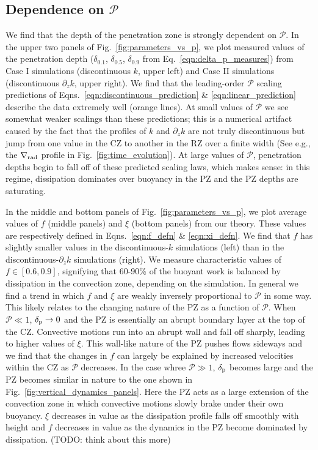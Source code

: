 \documentclass{aastex631}
\newcommand{\gradrad}{\ensuremath{\nabla_{\rm{rad}}}}
\newcommand{\delp}{\ensuremath{\delta_{\rm{p}}}}
\newcommand{\mP}{\ensuremath{\mathcal{P}}}
\begin{document}
\subsection{Dependence on $\mP$}

We find that the depth of the penetration zone is strongly dependent on $\mP$.
In the upper two panels of Fig.~\ref{fig:parameters_vs_p}, we plot measured values of the penetration depth ($\delta_{0.1}$, $\delta_{0.5}$, $\delta_{0.9}$ from Eq.~\ref{eqn:delta_p_measures}) from Case I simulations (discontinuous $k$, upper left) and Case II simulations (discontinuous $\partial_z k$, upper right).
We find that the leading-order $\mP$ scaling predictions of Eqns.~\ref{eqn:discontinuous_prediction} \& \ref{eqn:linear_prediction} describe the data extremely well (orange lines).
At small values of $\mP$ we see somewhat weaker scalings than these predictions; this is a numerical artifact caused by the fact that the profiles of $k$ and $\partial_z k$ are not truly discontinuous but jump from one value in the CZ to another in the RZ over a finite width (See e.g., the $\gradrad$ profile in Fig.~\ref{fig:time_evolution}).
At large values of $\mP$, penetration depths begin to fall off of these predicted scaling laws, which makes sense: in this regime, dissipation dominates over buoyancy in the PZ and the PZ depths are saturating.

In the middle and bottom panels of Fig.~\ref{fig:parameters_vs_p}, we plot average values of $f$ (middle panels) and $\xi$ (bottom panels) from our theory.
These values are respectively defined in Eqns.~\ref{eqn:f_defn} \& \ref{eqn:xi_defn}.
We find that $f$ has slightly smaller values in the discontinuous-$k$ simulations (left) than in the discontinuous-$\partial_z k$ simulations (right).
We measure characteristic values of $f \in [0.6, 0.9]$, signifying that 60-90\% of the buoyant work is balanced by dissipation in the convection zone, depending on the simulation.
In general we find a trend in which $f$ and $\xi$ are weakly inversely proportional to $\mP$ in some way.
This likely relates to the changing nature of the PZ as a function of $\mP$.
When $\mP \ll 1$, $\delp \rightarrow 0$ and the PZ is essentially an abrupt boundary layer at the top of the CZ.
Convective motions run into an abrupt wall and fall off sharply, leading to higher values of $\xi$.
This wall-like nature of the PZ pushes flows sideways and we find that the changes in $f$ can largely be explained by increased velocities within the CZ as $\mP$ decreases.
In the case whree $\mP \gg 1$, $\delp$ becomes large and the PZ becomes similar in nature to the one shown in Fig.~\ref{fig:vertical_dynamics_panels}.
Here the PZ acts as a large extension of the convection zone in which convective motions slowly brake under their own buoyancy.
$\xi$ decreases in value as the dissipation profile falls off smoothly with height and $f$ decreases in value as the dynamics in the PZ become dominated by dissipation.
(TODO: think about this more)
\end{document}
